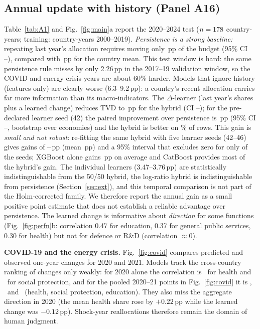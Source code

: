 
\figAudit

\subsection{Annual update with history (Panel A16)}\label{sec:temporal}
Table~\ref{tab:A1} and Fig.~\ref{fig:main}a report the 2020--2024 test ($n=178$ country-years; training: \ATrain{} country-years 2000--2019). \emph{Persistence is a strong baseline:} repeating last year's allocation requires moving only \ResTVDPersist\,pp of the budget (95\% CI \ResTVDPersistLo--\ResTVDPersistHi), compared with \ResTVDCountryMean\,pp for the country mean. This test window is hard: the same persistence rule misses by only 2.26\,pp in the 2017--19 validation window, so the COVID and energy-crisis years are about 60\% harder. Models that ignore history (features only) are clearly worse (6.3--9.2\,pp): a country's recent allocation carries far more information than its macro-indicators. The $\Delta$-learner (last year's shares plus a learned change) reduces TVD to \ResTVDHyb\,pp for the hybrid (CI \ResTVDHybLo--\ResTVDHybHi); for the pre-declared learner seed (42) the paired improvement over persistence is \ResPairedGain\,pp (95\% CI \ResPairedLo--\ResPairedHi, bootstrap over economies) and the hybrid is better on \ResRowsImproved\% of rows. This gain is \emph{small and not robust}: re-fitting the same hybrid with five learner seeds (42--46) gives gains of \AnnSeedMinGain--\AnnSeedMaxGain\,pp (mean \AnnSeedMeanGain\,pp) and a 95\% interval that excludes zero for only \AnnSeedNExcl{} of the \AnnSeedN{} seeds; XGBoost alone gains \AnnXgbSeedMeanGain\,pp on average and CatBoost provides most of the hybrid's gain. The individual learners (3.47--3.76\,pp) are statistically indistinguishable from the 50/50 hybrid, the log-ratio hybrid is indistinguishable from persistence (Section~\ref{sec:ext}), and this temporal comparison is not part of the Holm-corrected family. We therefore report the annual gain as a small positive point estimate that does not establish a reliable advantage over persistence. The learned change is informative about \emph{direction} for some functions (Fig.~\ref{fig:perfn}b: correlation 0.47 for education, 0.37 for general public services, 0.30 for health) but not for defence or R\&D (correlation $\approx0$).


\figMain

\textbf{COVID-19 and the energy crisis.} Fig.~\ref{fig:covid} compares predicted and observed one-year changes for 2020 and 2021. Models track the cross-country ranking of changes only weakly: for 2020 alone the correlation is \CovTwentyHealth\ for health and \CovTwentySocial\ for social protection, and for the pooled 2020--21 points in Fig.~\ref{fig:covid} it is \CovPooledHealth, \CovPooledSocial\ and \CovPooledEducation\ (health, social protection, education). They also miss the aggregate direction in 2020 (the mean health share rose by $+0.22$\,pp while the learned change was $-0.12$\,pp). Shock-year reallocations therefore remain the domain of human judgment.

